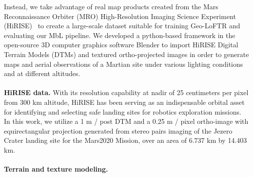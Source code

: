Instead, we take advantage of real map products created from the Mars Reconnaissance Orbiter (MRO) High-Resolution Imaging Science Experiment (HiRISE)~\cite{hirise} to create a large-scale dataset suitable for training Geo-LoFTR and evaluating our MbL pipeline. We developed a python-based framework in the open-source 3D computer graphics software Blender to import HiRISE Digital Terrain Models (DTMs) and textured ortho-projected images in order to generate maps and aerial observations of a Martian site under various lighting conditions and at different altitudes.
\\
\\
\noindent \textbf{HiRISE data.}
With its resolution capability at nadir of 25 centimeters per pixel from 300 km altitude, HiRISE has been serving as an indispensable orbital asset for identifying and selecting safe landing sites for robotics exploration missions. 
In this work, we utilize a 1 m / post DTM and a 0.25 m / pixel ortho-image with equirectangular projection generated from stereo pairs imaging of the Jezero Crater landing site for the Mars2020 Mission, over an area of 6.737 km by 14.403 km. 
\\
\\
\noindent \textbf{Terrain and texture modeling.}
